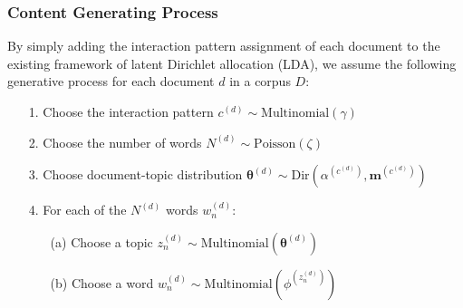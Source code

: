 \documentclass[a4paper]{article}
\begin{document}
\subsubsection{Content Generating Process} \label{subsubsec: Content Generating Process}
By simply adding the interaction pattern assignment of each document to the existing framework of latent Dirichlet allocation (LDA), we assume the following generative process for each document $d$ in a corpus $D$:
\begin{itemize}
	\item[1.] Choose the interaction pattern $c^{(d)} \sim \mbox{Multinomial}(\gamma)$
	\item[2.] Choose the number of words $N^{(d)} \sim \mbox{Poisson}(\zeta)$
	\item[3.] Choose document-topic distribution $\boldsymbol{\theta}^{(d)}\sim \mbox{Dir}(\alpha^{(c^{(d)})}, \boldsymbol{m}^{(c^{(d)})})$
	\item[4.] For each of the $N^{(d)}$ words $w_n^{(d)}$:
 		\begin{itemize}
 			\item[(a)] Choose a topic $z_n^{(d)} \sim \mbox{Multinomial}(\boldsymbol{\theta}^{(d)})$
 			\item[(b)] Choose a word $w_n^{(d)} \sim\mbox{Multinomial} (\phi^{(z_n^{(d)})})$
 		\end{itemize}
\end{itemize}
\end{document}
